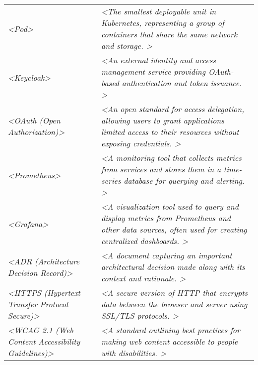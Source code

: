 \begin{longtable}[]{@{}
  >{\raggedright\arraybackslash}p{}
  >{\raggedright\arraybackslash}p{}@{}}
\emph{\textless Pod\textgreater{}} & 
\emph{\textless The smallest deployable unit in Kubernetes, representing a group of containers that share the same network and storage. \textgreater{}} \\

\emph{\textless Keycloak\textgreater{}} & 
\emph{\textless An external identity and access management service providing OAuth-based authentication and token issuance. \textgreater{}} \\

\emph{\textless OAuth (Open Authorization)\textgreater{}} & 
\emph{\textless An open standard for access delegation, allowing users to grant applications limited access to their resources without exposing credentials. \textgreater{}} \\

\emph{\textless Prometheus\textgreater{}} & 
\emph{\textless A monitoring tool that collects metrics from services and stores them in a time-series database for querying and alerting. \textgreater{}} \\

\emph{\textless Grafana\textgreater{}} & 
\emph{\textless A visualization tool used to query and display metrics from Prometheus and other data sources, often used for creating centralized dashboards. \textgreater{}} \\

\emph{\textless ADR (Architecture Decision Record)\textgreater{}} & 
\emph{\textless A document capturing an important architectural decision made along with its context and rationale. \textgreater{}} \\

\emph{\textless HTTPS (Hypertext Transfer Protocol Secure)\textgreater{}} & 
\emph{\textless A secure version of HTTP that encrypts data between the browser and server using SSL/TLS protocols. \textgreater{}} \\

\emph{\textless WCAG 2.1 (Web Content Accessibility Guidelines)\textgreater{}} & 
\emph{\textless A standard outlining best practices for making web content accessible to people with disabilities. \textgreater{}} \\


\bottomrule
\end{longtable}